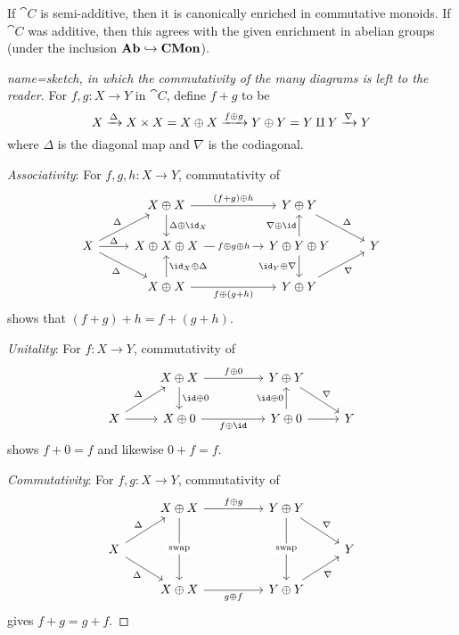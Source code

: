 \documentclass[../main.tex]{subfiles}
\begin{document}
\begin{lem}
  If $\cat C$ is semi-additive, then it is canonically enriched in commutative monoids. If $\cat C$ was additive, then this agrees with the given enrichment in abelian groups (under the inclusion $\mathbf{Ab} \hookrightarrow \mathbf{CMon}$).
\end{lem}
\begin{proof}[name={sketch, in which the commutativity of the many diagrams is left to the reader}]
  For $f, g\colon X \to Y$ in $\cat C$, define $f + g$ to be
  \[
    X \xrightarrow{\Delta} X \times X = X \oplus X \xrightarrow{f \oplus g} Y \oplus Y = Y \amalg Y \xrightarrow{\nabla} Y
  \] where $\Delta$ is the diagonal map and $\nabla$ is the codiagonal.

  \emph{Associativity}: For $f, g, h\colon X\to Y$, commutativity of 
\[\begin{tikzcd}
  & {X\oplus X} && {Y\oplus Y} \\
  X & {X\oplus X\oplus X} && {Y\oplus Y\oplus Y} & Y \\
  & {X\oplus X} && {Y\oplus Y}
  \arrow["\Delta", from=2-1, to=1-2]
  \arrow["{\id_X \oplus \Delta}"', from=3-2, to=2-2]
  \arrow["{\Delta \oplus \id_X}", from=1-2, to=2-2]
  \arrow["\Delta", from=2-1, to=2-2]
  \arrow["\Delta"', from=2-1, to=3-2]
  \arrow["{f \oplus(g+h)}"', from=3-2, to=3-4]
  \arrow["{(f+g)\oplus h}", from=1-2, to=1-4]
  \arrow["{\nabla \oplus \id}", from=2-4, to=1-4]
  \arrow["{\id_Y \oplus \nabla}"', from=2-4, to=3-4]
  \arrow["\nabla"', from=3-4, to=2-5]
  \arrow["\Delta", from=1-4, to=2-5]
  \arrow["{f\oplus g\oplus h}"{description}, from=2-2, to=2-4]
\end{tikzcd}\]  
  shows that $(f+g) + h = f + (g + h)$.

  \emph{Unitality}: For $f\colon X \to Y$, commutativity of 
\[\begin{tikzcd}
  & {X\oplus X} && {Y\oplus Y} \\
  X & {X \oplus 0} && {Y\oplus 0} & Y
  \arrow[from=2-1, to=2-2]
  \arrow["\id\oplus0", from=1-2, to=2-2]
  \arrow["\Delta", from=2-1, to=1-2]
  \arrow["{f\oplus \id}"', from=2-2, to=2-4]
  \arrow["{f\oplus 0}", from=1-2, to=1-4]
  \arrow["\nabla", from=1-4, to=2-5]
  \arrow[from=2-4, to=2-5]
  \arrow["{\id \oplus 0}", from=2-4, to=1-4]
\end{tikzcd}\]  
   shows $f + 0 = f$ and likewise $ 0 + f = f$.

   \emph{Commutativity}: For $f,g\colon X \to Y$, commutativity of 
\[\begin{tikzcd}
  & {X\oplus X} && {Y\oplus Y} \\
  X &&&& Y \\
  & {X\oplus X} && {Y\oplus Y}
  \arrow["\nabla", from=1-4, to=2-5]
  \arrow["\nabla"', from=3-4, to=2-5]
  \arrow["{g \oplus f}"', from=3-2, to=3-4]
  \arrow["{f\oplus g}", from=1-2, to=1-4]
  \arrow["\Delta", from=2-1, to=1-2]
  \arrow["\Delta"', from=2-1, to=3-2]
  \arrow["{\text{swap}}"{description}, from=1-2, to=3-2]
  \arrow["{\text{swap}}"{description}, from=1-4, to=3-4]
\end{tikzcd}\]   gives $f + g = g + f$.


\end{proof}
\end{document}
